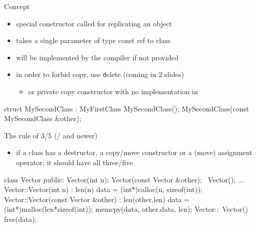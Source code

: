\begin{frame}[fragile]
  \begin{block}{Concept}
    \begin{itemize}
    \item special constructor called for replicating an object
    \item takes a single parameter of type const ref to class
    \item will be implemented by the compiler if not provided
    \item in order to forbid copy, use {\texttt delete} (coming in 2 slides)
      \begin{itemize}
      \item or private copy constructor with no implementation in 
      \end{itemize}
    \end{itemize}
  \end{block}
  \pause
  \begin{cppcode}
    struct MySecondClass : MyFirstClass {
      MySecondClass();
      MySecondClass(const MySecondClass &other);
    }    
  \end{cppcode}
  \pause
  \begin{exampleblock}{The rule of 3/5 (/ and newer)}
    \begin{itemize}
    \item if a class has a destructor, a copy/move constructor or a (move) assignment operator, it should have all three/five
    \end{itemize}
  \end{exampleblock}
\end{frame}

\begin{frame}[fragile]
  \begin{cppcode}
    class Vector {
    public:
      Vector(int n);
      Vector(const Vector &other);
      ~Vector();
      ...
    }
    Vector::Vector(int n) : len(n) {
      data = (int*)calloc(n, sizeof(int));
    }
    Vector::Vector(const Vector &other) : len(other.len) {
      data = (int*)malloc(len*sizeof(int));
      memcpy(data, other.data, len);
    }
    Vector::~Vector() { free(data); }
  \end{cppcode}
\end{frame}

